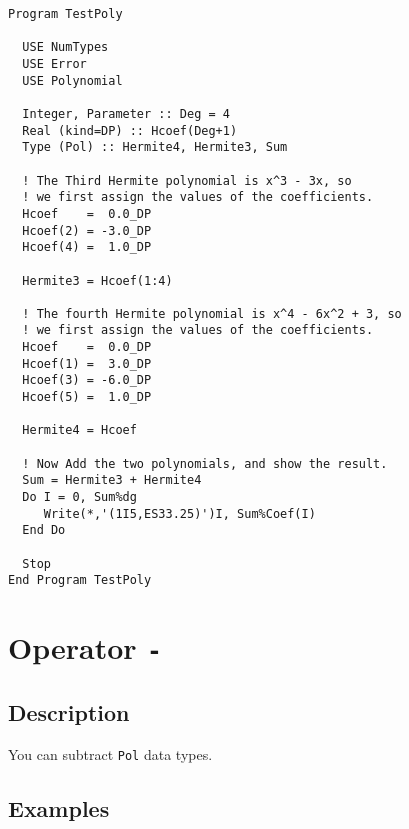 \begin{lstlisting}[emph=Type,
                   emphstyle=\color{blue},
                   frame=trBL,
                   caption=Adding polynomials.,
                   label=pluspol]
Program TestPoly

  USE NumTypes
  USE Error
  USE Polynomial

  Integer, Parameter :: Deg = 4
  Real (kind=DP) :: Hcoef(Deg+1)
  Type (Pol) :: Hermite4, Hermite3, Sum

  ! The Third Hermite polynomial is x^3 - 3x, so
  ! we first assign the values of the coefficients.
  Hcoef    =  0.0_DP
  Hcoef(2) = -3.0_DP
  Hcoef(4) =  1.0_DP

  Hermite3 = Hcoef(1:4)

  ! The fourth Hermite polynomial is x^4 - 6x^2 + 3, so
  ! we first assign the values of the coefficients.
  Hcoef    =  0.0_DP
  Hcoef(1) =  3.0_DP
  Hcoef(3) = -6.0_DP
  Hcoef(5) =  1.0_DP

  Hermite4 = Hcoef

  ! Now Add the two polynomials, and show the result.
  Sum = Hermite3 + Hermite4
  Do I = 0, Sum%dg
     Write(*,'(1I5,ES33.25)')I, Sum%Coef(I)
  End Do

  Stop
End Program TestPoly
\end{lstlisting}

\section{Operator \texttt{-}}

\subsection{Description}

You can subtract \texttt{Pol} data types.

\subsection{Examples}

